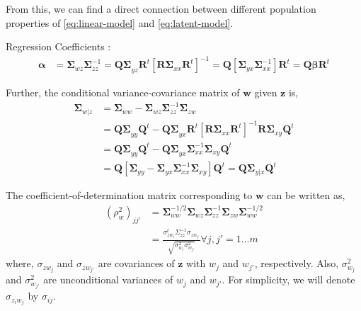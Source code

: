 \documentclass[review]{elsarticle}
\providecommand{\tightlist}{%
  \setlength{\itemsep}{0pt}\setlength{\parskip}{0pt}}
\theoremstyle{definition}
\theoremstyle{definition}
\theoremstyle{definition}
\theoremstyle{remark}
\begin{document}
From this, we can find a direct connection between different population
properties of \eqref{eq:linear-model} and \eqref{eq:latent-model}.

Regression Coefficients : \[
  \begin{aligned}
  \boldsymbol{\alpha} &= \boldsymbol{\Sigma}_{wz} \boldsymbol{\Sigma}_{zz}^{-1}
      = \boldsymbol{Q\Sigma}_{yz}\mathbf{R}^t\left[\boldsymbol{R\Sigma}_{xx}\mathbf{R}^t\right]^{-1}
      = \mathbf{Q}\left[\boldsymbol{\Sigma}_{yx}\boldsymbol{\Sigma}_{xx}^{-1}\right]\mathbf{R}^t
      = \mathbf{Q}\boldsymbol{\beta}\mathbf{R}^t
  \end{aligned}
  \]

\begin{description}
\tightlist
\item[Conditional Variance]
Further, the conditional variance-covariance matrix of \(\mathbf{w}\)
given \(\mathbf{z}\) is, \[
  \begin{aligned}
\boldsymbol{\Sigma}_{w|z}
&= \boldsymbol{\Sigma}_{ww} - \boldsymbol{\Sigma}_{wz}\boldsymbol{\Sigma}_{zz}^{-1}\boldsymbol{\Sigma}_{zw} \\
&= \boldsymbol{Q\Sigma}_{yy}\mathbf{Q}^t -
  \boldsymbol{Q \Sigma}_{yx}\mathbf{R}^t \left[\boldsymbol{R\Sigma}_{xx}\boldsymbol{R}^t\right]^{-1}
  \boldsymbol{R\Sigma}_{xy}\mathbf{Q}^t \nonumber \\
&= \boldsymbol{Q\Sigma}_{yy}\mathbf{Q}^t -
  \boldsymbol{Q \Sigma}_{yx}\boldsymbol{\Sigma}_{xx}^{-1}\boldsymbol{\Sigma}_{xy}\mathbf{Q}^t \\
&= \mathbf{Q}\left[\boldsymbol{\Sigma}_{yy} -
  \boldsymbol{\Sigma}_{yx}\boldsymbol{\Sigma}_{xx}^{-1}\boldsymbol{\Sigma}_{xy}\right]\mathbf{Q}^{t}
= \mathbf{Q} \boldsymbol{\Sigma}_{y|x}\mathbf{Q}^t
  \end{aligned}
  \]
\item[Coefficient of Determination]
The coefficient-of-determination matrix corresponding to \(\mathbf{w}\)
can be written as, \[
  \begin{aligned}
  \left(\rho_w^2\right)_{j{j'}} &=
\boldsymbol{\Sigma}_{ww}^{-1/2}
\boldsymbol{\Sigma}_{wz}
\boldsymbol{\Sigma}_{zz}^{-1} 
\boldsymbol{\Sigma}_{zw}
\boldsymbol{\Sigma}_{ww}^{-1/2} \\ &=
  \frac{\sigma_{zw_i}^t\Sigma_{zz}^{-1}\sigma_{zw_{j'}}}
  {\sqrt{\sigma_{w_i}^2\sigma_{w_{j'}}^2}} \forall j, {j'} = 1 \ldots m
  \end{aligned}
  \] where, \(\sigma_{zw_j}\) and \(\sigma_{zw_{j'}}\) are covariances
of \(\mathbf{z}\) with \(w_j\) and \(w_{j'}\), respectively. Also,
\(\sigma_{w_j}^2\) and \(\sigma_{w_{j'}}^2\) are unconditional variances
of \(w_j\) and \(w_{j'}\). For simplicity, we will denote
\(\sigma_{z_iw_j}\) by \(\sigma_{ij}\).
\end{description}
\end{document}

